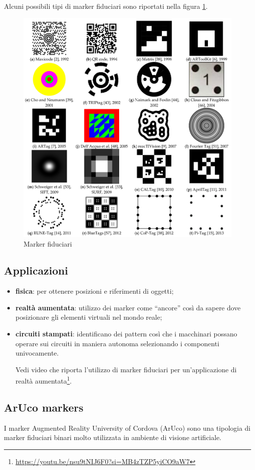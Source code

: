 \documentclass[12pt,a4paper,openright,twoside]{book}
\begin{document}
Alcuni possibili tipi di marker fiduciari sono riportati nella figura \ref{fig:marker_fiduciari}.

\begin{figure}[h!]
	\centering
	\includegraphics[width=0.8\linewidth]{./figures/fiducialMarkers.png}
	\caption{Marker fiduciari~\cite{s21165407}}
	\label{fig:marker_fiduciari}
\end{figure}

\subsection{Applicazioni}
\begin{itemize}
	\item \textbf{fisica}: per ottenere posizioni e riferimenti di oggetti;
	\item \textbf{realtà aumentata}: utilizzo dei marker come ``ancore'' così da sapere dove posizionare gli elementi virtuali nel mondo reale;
	\item \textbf{circuiti stampati}: identificano dei pattern così che i macchinari possano operare sui circuiti in maniera autonoma selezionando i componenti univocamente.
	
	
	Vedi video che riporta l'utilizzo di marker fiduciari per un'applicazione di realtà aumentata\footnote{\url{https://youtu.be/nsu9tNIJ6F0?si=MB4zTZP5yiCO9aW7}}.
\end{itemize}

\subsection{ArUco markers} \label{subsec:aruco_markers}
I marker Augmented Reality University of Cordova (ArUco) sono una tipologia di marker fiduciari binari molto utilizzata in ambiente di visione artificiale.
\end{document}
